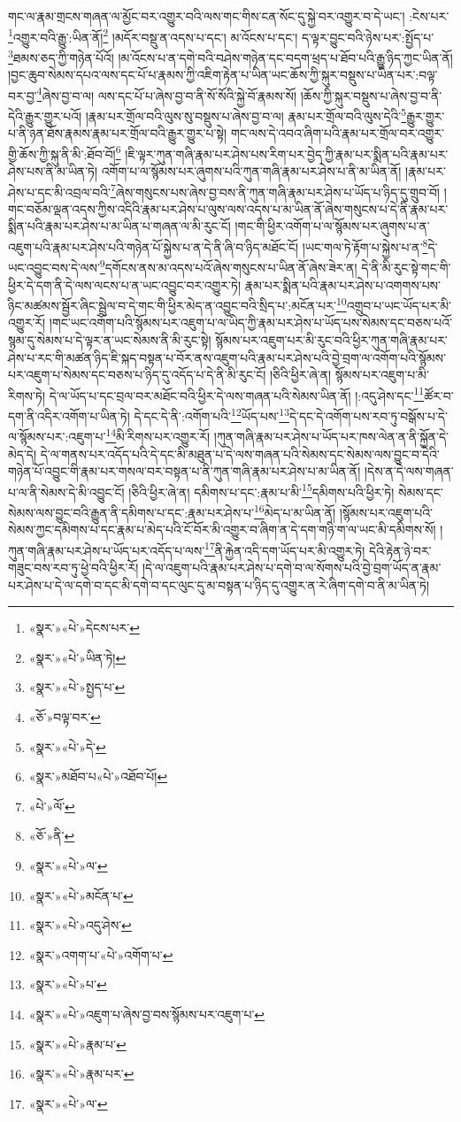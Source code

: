 གང་ལ་རྣམ་གྲངས་གཞན་ལ་མྱོང་བར་འགྱུར་བའི་ལས་གང་གིས་ངན་སོང་དུ་སྐྱེ་བར་འགྱུར་བ་དེ་ཡང་། :ངེས་པར་\footnote{«སྣར་»«པེ་»དེངས་པར་}འགྱུར་བའི་རྒྱུ་:ཡིན་ནོ།\footnote{«སྣར་»«པེ་»ཡིན་ཏེ།} །མདོར་བསྡུ་ན་འདས་པ་དང་། མ་འོངས་པ་དང་། ད་ལྟར་བྱུང་བའི་ཉེས་པར་:སྤྱོད་པ་\footnote{«སྣར་»«པེ་»སྤྱད་པ་}ཐམས་ཅད་ཀྱི་གཉེན་པོའོ། །མ་འོངས་པ་ན་དགེ་བའི་བཤེས་གཉེན་དང་བདག་ཕྲད་པ་ཐོབ་པའི་རྒྱུ་ཉིད་ཀྱང་ཡིན་ནོ། །བྱང་ཆུབ་སེམས་དཔའ་ལས་དང་པོ་པ་རྣམས་ཀྱི་འཇིག་རྟེན་པ་ཡིན་ཡང་ཆོས་ཀྱི་སྐུར་བསྡུས་པ་ཡིན་པར་:བལྟ་བར་བྱ་\footnote{«ཅོ་»བལྟ་བར་}ཞེས་བྱ་བ་ལ། ལས་དང་པོ་པ་ཞེས་བྱ་བ་ནི་སོ་སོའི་སྐྱེ་བོ་རྣམས་སོ། །ཆོས་ཀྱི་སྐུར་བསྡུས་པ་ཞེས་བྱ་བ་ནི་དེའི་རྒྱུར་གྱུར་པའོ། །རྣམ་པར་གྲོལ་བའི་ལུས་སུ་བསྡུས་པ་ཞེས་བྱ་བ་ལ། རྣམ་པར་གྲོལ་བའི་ལུས་དེའི་\footnote{«སྣར་»«པེ་»དེ་}རྒྱུར་གྱུར་པ་ནི་ཉན་ཐོས་རྣམས་རྣམ་པར་གྲོལ་བའི་རྒྱུར་གྱུར་པ་སྟེ། གང་ལས་དེ་འབའ་ཞིག་པའི་རྣམ་པར་གྲོལ་བར་འགྱུར་གྱི་ཆོས་ཀྱི་སྐུ་ནི་མི་:ཐོབ་བོ།\footnote{«སྣར་»མཐོབ་པ«པེ་»འཐོབ་པོ།} །ཇི་ལྟར་ཀུན་གཞི་རྣམ་པར་ཤེས་པས་རིག་པར་བྱེད་ཀྱི་རྣམ་པར་སྨིན་པའི་རྣམ་པར་ཤེས་པས་ནི་མ་ཡིན་ཏེ། འགོག་པ་ལ་སྙོམས་པར་ཞུགས་པའི་ཀུན་གཞི་རྣམ་པར་ཤེས་པ་ནི་མ་ཡིན་ནོ། །རྣམ་པར་ཤེས་པ་དང་མི་འབྲལ་བའི་\footnote{«པེ་»ལོ་}ཞེས་གསུངས་པས་ཞེས་བྱ་བས་ནི་ཀུན་གཞི་རྣམ་པར་ཤེས་པ་ཡོད་པ་ཉིད་དུ་གྲུབ་བོ། །གང་བཅོམ་ལྡན་འདས་ཀྱིས་འདིའི་རྣམ་པར་ཤེས་པ་ལུས་ལས་འདས་པ་མ་ཡིན་ནོ་ཞེས་གསུངས་པ་དེ་ནི་རྣམ་པར་སྨིན་པའི་རྣམ་པར་ཤེས་པ་མ་ཡིན་པ་གཞན་ལ་མི་རུང་ངོ། །གང་གི་ཕྱིར་འགོག་པ་ལ་སྙོམས་པར་ཞུགས་པ་ན་འཇུག་པའི་རྣམ་པར་ཤེས་པའི་གཉེན་པོ་སྐྱེས་པ་ན་དེ་ནི་ཞི་བ་ཉིད་མཐོང་ངོ། །ཡང་གལ་ཏེ་རྟོག་པ་སྐྱེས་པ་ན་\footnote{«ཅོ་»ནི་}དེ་ཡང་འབྱུང་བས་དེ་ལས་\footnote{«སྣར་»«པེ་»ལ་}དགོངས་ནས་མ་འདས་པའོ་ཞེས་གསུངས་པ་ཡིན་ནོ་ཞེས་ཟེར་ན། དེ་ནི་མི་རུང་སྟེ་གང་གི་ཕྱིར་དེ་དག་ནི་དེ་ལས་ལངས་པ་ན་ཡང་འབྱུང་བར་འགྱུར་ཏེ། རྣམ་པར་སྨིན་པའི་རྣམ་པར་ཤེས་པ་འགགས་པས་ཉིང་མཚམས་སྦྱོར་ཞིང་སྦྲེལ་བ་དེ་གང་གི་ཕྱིར་མེད་ན་འབྱུང་བའི་སྲིད་པ་:མངོན་པར་\footnote{«སྣར་»«པེ་»མངོན་པ་}འགྲུབ་པ་ཡང་ཡོད་པར་མི་འགྱུར་རོ། །གང་ཡང་འགོག་པའི་སྙོམས་པར་འཇུག་པ་ལ་ཡིད་ཀྱི་རྣམ་པར་ཤེས་པ་ཡོད་པས་སེམས་དང་བཅས་པའོ་སྙམ་དུ་སེམས་པ་དེ་ལྟར་ན་ཡང་སེམས་ནི་མི་རུང་སྟེ། སྙོམས་པར་འཇུག་པར་མི་རུང་བའི་ཕྱིར་ཀུན་གཞི་རྣམ་པར་ཤེས་པ་རང་གི་མཚན་ཉིད་ཇི་སྐད་བསྟན་པ་བོར་ནས་འཇུག་པའི་རྣམ་པར་ཤེས་པའི་བྱེ་བྲག་ལ་འགོག་པའི་སྙོམས་པར་འཇུག་པ་སེམས་དང་བཅས་པ་ཉིད་དུ་འདོད་པ་དེ་ནི་མི་རུང་ངོ། །ཅིའི་ཕྱིར་ཞེ་ན། སྙོམས་པར་འཇུག་པ་མི་རིགས་ཏེ། དེ་ལ་ཡོད་པ་དང་བྲལ་བར་མཐོང་བའི་ཕྱིར་དེ་ལས་གཞན་པའི་སེམས་ཡིན་ནོ། །:འདུ་ཤེས་དང་\footnote{«སྣར་»«པེ་»འདུ་ཤེས་}ཚོར་བ་དག་ནི་འདིར་འགོག་པ་ཡིན་ཏེ། དེ་དང་དེ་ནི་:འགོག་པའི་\footnote{«སྣར་»འགག་པ་«པེ་»འགོག་པ་}ཡོད་པས་\footnote{«སྣར་»«པེ་»པ་}དེ་དང་དེ་འགོག་པས་རབ་ཏུ་བསྒོས་པ་དེ་ལ་སྙོམས་པར་:འཇུག་པ་\footnote{«སྣར་»«པེ་»འཇུག་པ་ཞེས་བྱ་བས་སྙོམས་པར་འཇུག་པ་}མི་རིགས་པར་འགྱུར་རོ། །ཀུན་གཞི་རྣམ་པར་ཤེས་པ་ཡོད་པར་ཁས་ལེན་ན་ནི་སྐྱོན་དེ་མེད་དེ། དེ་ལ་གནས་པར་འདོད་པའི་དེ་དང་མི་མཐུན་པ་དེ་ལས་གཞན་པའི་སེམས་དང་སེམས་ལས་བྱུང་བ་དེའི་གཉེན་པོ་འབྱུང་གི་རྣམ་པར་གསལ་བར་བསྟན་པ་ནི་ཀུན་གཞི་རྣམ་པར་ཤེས་པ་མ་ཡིན་ནོ། །དེས་ན་དེ་ལས་གཞན་པ་ལ་ནི་སེམས་དེ་མི་འབྱུང་ངོ། །ཅིའི་ཕྱིར་ཞེ་ན། དམིགས་པ་དང་:རྣམ་པ་མི་\footnote{«སྣར་»«པེ་»རྣམ་པ་}དམིགས་པའི་ཕྱིར་ཏེ། སེམས་དང་སེམས་ལས་བྱུང་བའི་རྒྱུན་ནི་དམིགས་པ་དང་:རྣམ་པར་ཤེས་པ་\footnote{«སྣར་»«པེ་»རྣམ་པར་}མེད་པ་མ་ཡིན་ནོ། །སྙོམས་པར་འཇུག་པའི་སེམས་ཀྱང་དམིགས་པ་དང་རྣམ་པ་མེད་པའི་ངོ་བོར་མི་འགྱུར་བ་ཞིག་ན་དེ་དག་གཉི་ག་ལ་ཡང་མི་དམིགས་སོ། །ཀུན་གཞི་རྣམ་པར་ཤེས་པ་ཡོད་པར་འདོད་པ་ལས་\footnote{«སྣར་»«པེ་»ལ་}ནི་རྐྱེན་འདི་དག་ཡོད་པར་མི་འགྱུར་ཏེ། དེའི་རྟེན་ཉེ་བར་གཟུང་བས་རབ་ཏུ་ཕྱེ་བའི་ཕྱིར་རོ། །དེ་ལ་འཇུག་པའི་རྣམ་པར་ཤེས་པ་དགེ་བ་ལ་སོགས་པའི་བྱེ་བྲག་ཡོད་ན་རྣམ་པར་ཤེས་པ་དེ་ལ་དགེ་བ་དང་མི་དགེ་བ་དང་ལུང་དུ་མ་བསྟན་པ་ཉིད་དུ་འགྱུར་ན་རེ་ཞིག་དགེ་བ་ནི་མ་ཡིན་ཏེ། 